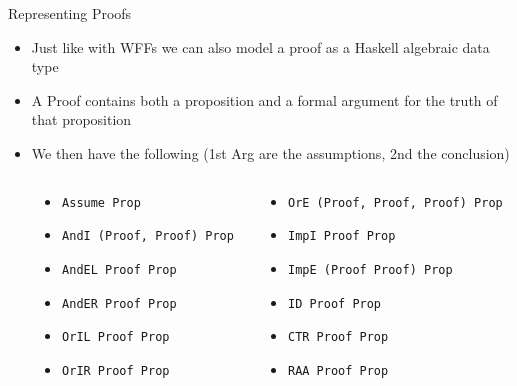 \documentclass[11pt,t,pdf,xcolor=svgnames,aspectratio=169]{beamer}
\providecommand{\tightlist}{%
  \setlength{\itemsep}{5pt}\setlength{\parskip}{0pt}}
\begin{document}
\begin{frame}[fragile]{Representing Proofs}
\protect\hypertarget{representing-proofs}{}
\begin{itemize}
\item
  Just like with WFFs we can also model a proof as a Haskell algebraic
  data type
\item
  A Proof contains both a proposition and a formal argument for the
  truth of that proposition
\item
  We then have the following (1st Arg are the assumptions, 2nd the
  conclusion)
\end{itemize}

\begin{columns}[T]
\begin{column}{.05\textwidth}
\end{column}

\begin{column}{.475\textwidth}
\begin{itemize}
\tightlist
\item
  \texttt{Assume\ Prop}
\item
  \texttt{AndI\ (Proof,\ Proof)\ Prop}
\item
  \texttt{AndEL\ Proof\ Prop}
\item
  \texttt{AndER\ Proof\ Prop}
\item
  \texttt{OrIL\ Proof\ Prop}
\item
  \texttt{OrIR\ Proof\ Prop}
\end{itemize}
\end{column}

\begin{column}{.475\textwidth}
\begin{itemize}
\tightlist
\item
  \texttt{OrE\ (Proof,\ Proof,\ Proof)\ Prop}
\item
  \texttt{ImpI\ Proof\ Prop}
\item
  \texttt{ImpE\ (Proof\ Proof)\ Prop}
\item
  \texttt{ID\ Proof\ Prop}
\item
  \texttt{CTR\ Proof\ Prop}
\item
  \texttt{RAA\ Proof\ Prop}
\end{itemize}
\end{column}
\end{columns}
\end{frame}
\end{document}

